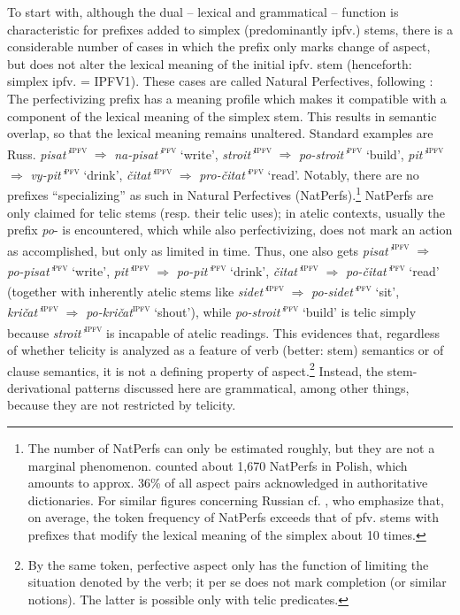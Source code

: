 \documentclass[output=paper]{langscibook}
\begin{document}
To start with, although the dual – lexical and grammatical – function is characteristic for prefixes added to simplex (predominantly ipfv.) stems, there is a considerable number of cases in which the prefix only marks change of aspect, but does not alter the lexical meaning of the initial ipfv. stem (henceforth: simplex ipfv. = IPFV1). These cases are called Natural Perfectives, following \citet{JandaEtAl2013}: The perfectivizing prefix has a meaning profile which makes it compatible with a component of the lexical meaning of the simplex stem. This results in semantic overlap, so that the lexical meaning remains unaltered. Standard examples are Russ. \textit{pisat’}\textsc{\textsuperscript{ipfv}} ${\Rightarrow}$ \textit{na-pisat’}\textsc{\textsuperscript{pfv}} ‘write’, \textit{stroit’}\textsc{\textsuperscript{ipfv}} ${\Rightarrow}$ \textit{po-stroit’}\textsc{\textsuperscript{pfv}} ‘build’, \textit{pit’}\textsc{\textsuperscript{ipfv}} ${\Rightarrow}$ \textit{vy-pit’}\textsc{\textsuperscript{pfv}} ‘drink’, \textit{čitat’}\textsc{\textsuperscript{ipfv}} ${\Rightarrow}$ \textit{pro-čitat’}\textsc{\textsuperscript{pfv}} ‘read’. Notably, there are no prefixes “specializing” as such in Natural Perfectives (NatPerfs).\footnote{The number of NatPerfs can only be estimated roughly, but they are not a marginal phenomenon. \citet{Łaziński2020}  counted about 1,670 NatPerfs in Polish, which amounts to approx. 36\% of all aspect pairs acknowledged in authoritative dictionaries. For similar figures concerning Russian cf. \citet{JandaEtAl2013}, who emphasize that, on average, the token frequency of NatPerfs exceeds that of pfv. stems with prefixes that modify the lexical meaning of the simplex about 10 times.} NatPerfs are only claimed for telic stems (resp. their telic uses); in atelic contexts, usually the prefix \textit{po}{}- is encountered, which while also perfectivizing, does not mark an action as accomplished, but only as limited in time. Thus, one also gets \textit{pisat’}\textsc{\textsuperscript{ipfv}} ${\Rightarrow}$ \textit{po-pisat’}\textsc{\textsuperscript{pfv}} ‘write’, \textit{pit’}\textsc{\textsuperscript{ipfv}} ${\Rightarrow}$ \textit{po-pit’}\textsc{\textsuperscript{pfv}} ‘drink’, \textit{čitat’}\textsc{\textsuperscript{ipfv}} ${\Rightarrow}$ \textit{po-čitat’}\textsc{\textsuperscript{pfv}} ‘read’ (together with inherently atelic stems like \textit{sidet’}\textsc{\textsuperscript{ipfv}} ${\Rightarrow}$ \textit{po-sidet’}\textsc{\textsuperscript{pfv}} ‘sit’, \textit{kričat’}\textsc{\textsuperscript{ipfv}} ${\Rightarrow}$ \textit{po-kričat}\textsc{\textsuperscript{ipfv}} ‘shout’), while \textit{po-stroit’}\textsc{\textsuperscript{pfv}} ‘build’ is telic simply because \textit{stroit’}\textsc{\textsuperscript{ipfv}} is incapable of atelic readings. This evidences that, regardless of whether telicity is analyzed as a feature of verb (better: stem) semantics or of clause semantics, it is not a defining property of aspect.\footnote{By the same token, perfective aspect only has the function of limiting the situation denoted by the verb; it per se does not mark completion (or similar notions). The latter is possible only with telic predicates.} Instead, the stem-derivational patterns discussed here are grammatical, among other things, because they are not restricted by telicity. 
\end{document}
